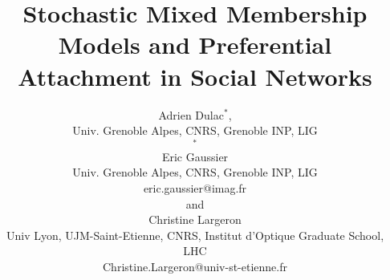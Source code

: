 \documentclass[numbib]{imaiai}
\newcommand{\blind}{0}
\begin{document}



%

\title{Stochastic Mixed Membership Models and Preferential Attachment in Social Networks}

\author{{%
\sc Adrien Dulac}$^*$,\\[2pt]
Univ. Grenoble Alpes, CNRS, Grenoble INP, LIG\\
$^*${}\\[2pt]
{\sc Eric Gaussier}\\[2pt]
Univ. Grenoble Alpes, CNRS, Grenoble INP, LIG\\
{eric.gaussier@imag.fr}\\[6pt]
{\sc and}\\[6pt]
{\sc Christine Largeron} \\[2pt]
Univ Lyon, UJM-Saint-Etienne, CNRS, Institut d’Optique Graduate School, LHC\\
{Christine.Largeron@univ-st-etienne.fr}}
\end{document}
